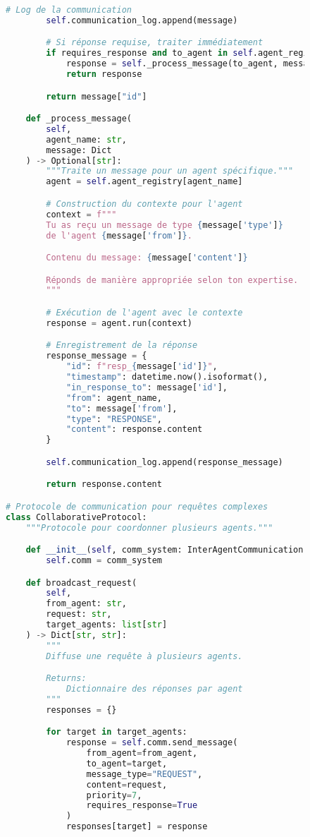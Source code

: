 \begin{figure}[H]
\begin{lstlisting}[language=Python, caption=Architecture de communication inter-agents]
        # Log de la communication
        self.communication_log.append(message)

        # Si réponse requise, traiter immédiatement
        if requires_response and to_agent in self.agent_registry:
            response = self._process_message(to_agent, message)
            return response

        return message["id"]

    def _process_message(
        self,
        agent_name: str,
        message: Dict
    ) -> Optional[str]:
        """Traite un message pour un agent spécifique."""
        agent = self.agent_registry[agent_name]

        # Construction du contexte pour l'agent
        context = f"""
        Tu as reçu un message de type {message['type']}
        de l'agent {message['from']}.

        Contenu du message: {message['content']}

        Réponds de manière appropriée selon ton expertise.
        """

        # Exécution de l'agent avec le contexte
        response = agent.run(context)

        # Enregistrement de la réponse
        response_message = {
            "id": f"resp_{message['id']}",
            "timestamp": datetime.now().isoformat(),
            "in_response_to": message['id'],
            "from": agent_name,
            "to": message['from'],
            "type": "RESPONSE",
            "content": response.content
        }

        self.communication_log.append(response_message)

        return response.content

# Protocole de communication pour requêtes complexes
class CollaborativeProtocol:
    """Protocole pour coordonner plusieurs agents."""

    def __init__(self, comm_system: InterAgentCommunication):
        self.comm = comm_system

    def broadcast_request(
        self,
        from_agent: str,
        request: str,
        target_agents: list[str]
    ) -> Dict[str, str]:
        """
        Diffuse une requête à plusieurs agents.

        Returns:
            Dictionnaire des réponses par agent
        """
        responses = {}

        for target in target_agents:
            response = self.comm.send_message(
                from_agent=from_agent,
                to_agent=target,
                message_type="REQUEST",
                content=request,
                priority=7,
                requires_response=True
            )
            responses[target] = response


\end{lstlisting}
\end{figure}
